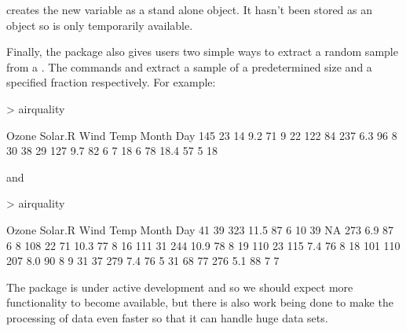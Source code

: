 creates the new variable as a stand alone object. It hasn't been stored as an object so is only temporarily available.  
 
Finally, the  package also gives users two simple ways to extract a random sample from a . The commands  and   
extract a sample of a predetermined size and a specified fraction respectively. For example: 

\begin{Schunk}
\begin{Sinput}
> airquality %>% sample_n(4) 
\end{Sinput}
\begin{Soutput}
    Ozone Solar.R Wind Temp Month Day
145    23      14  9.2   71     9  22
122    84     237  6.3   96     8  30
38     29     127  9.7   82     6   7
18      6      78 18.4   57     5  18
\end{Soutput}
\end{Schunk}
 and %

\begin{Schunk}
\begin{Sinput}
> airquality %>% sample_frac(0.05) 
\end{Sinput}
\begin{Soutput}
    Ozone Solar.R Wind Temp Month Day
41     39     323 11.5   87     6  10
39     NA     273  6.9   87     6   8
108    22      71 10.3   77     8  16
111    31     244 10.9   78     8  19
110    23     115  7.4   76     8  18
101   110     207  8.0   90     8   9
31     37     279  7.4   76     5  31
68     77     276  5.1   88     7   7
\end{Soutput}
\end{Schunk}

 
The   package is under active development and so we should expect more functionality to become available, but there is also work being done to make the processing of data even faster so that it can handle huge data sets. 
 

